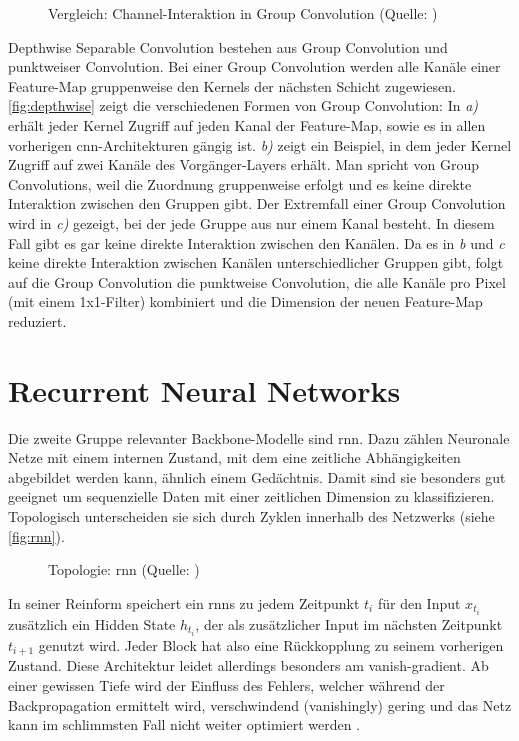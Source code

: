 \begin{figure}[h!]
    \centering
    \caption{Vergleich: Channel-Interaktion in Group Convolution (Quelle: \cite{Tran19})}
    \label{fig:depthwise}
\end{figure}

Depthwise Separable Convolution bestehen aus Group Convolution und punktweiser Convolution.
Bei einer Group Convolution werden alle Kanäle einer Feature-Map gruppenweise den Kernels der nächsten Schicht zugewiesen.
\autoref{fig:depthwise} zeigt die verschiedenen Formen von Group Convolution:
In \emph{a)} erhält jeder Kernel Zugriff auf jeden Kanal der Feature-Map, sowie es in allen vorherigen \gls{cnn}-Architekturen gängig ist.
\emph{b)} zeigt ein Beispiel, in dem jeder Kernel Zugriff auf zwei Kanäle des Vorgänger-Layers erhält.
Man spricht von Group Convolutions, weil die Zuordnung gruppenweise erfolgt und es keine direkte Interaktion zwischen den Gruppen gibt.
Der Extremfall einer Group Convolution wird in \emph{c)} gezeigt, bei der jede Gruppe aus nur einem Kanal besteht.
In diesem Fall gibt es gar keine direkte Interaktion zwischen den Kanälen.
Da es in \emph{b} und \emph{c} keine direkte Interaktion zwischen Kanälen unterschiedlicher Gruppen gibt, folgt auf die Group Convolution die punktweise Convolution, die alle Kanäle pro Pixel (mit einem 1x1-Filter) kombiniert und die Dimension der neuen Feature-Map reduziert.

\section{Recurrent Neural Networks}
\label{subsec:recurrent-neural-networks}

Die zweite Gruppe relevanter Backbone-Modelle sind \gls{rnn}.
Dazu zählen Neuronale Netze mit einem internen Zustand, mit dem eine zeitliche Abhängigkeiten abgebildet werden kann, ähnlich einem Gedächtnis.
Damit sind sie besonders gut geeignet um sequenzielle Daten mit einer zeitlichen Dimension zu klassifizieren.
Topologisch unterscheiden sie sich durch Zyklen innerhalb des Netzwerks (siehe \autoref{fig:rnn}).

\begin{figure}[h!]
    \centering
    \caption{Topologie: \gls{rnn} (Quelle: \cite{Veen17})}
    \label{fig:rnn}
\end{figure}

In seiner Reinform speichert ein \glspl{rnn} zu jedem Zeitpunkt $t_i$ für den Input $x_{t_i}$ zusätzlich ein Hidden State $h_{t_i}$, der als zusätzlicher Input im nächsten Zeitpunkt $t_{i+1}$ genutzt wird.
Jeder Block hat also eine Rückkopplung zu seinem vorherigen Zustand.
Diese Architektur leidet allerdings besonders am \gls{vanish-gradient}.
Ab einer gewissen Tiefe wird der Einfluss des Fehlers, welcher während der Backpropagation ermittelt wird, verschwindend (vanishingly) gering und das Netz kann im schlimmsten Fall nicht weiter optimiert werden \cite{Pointer19}.


